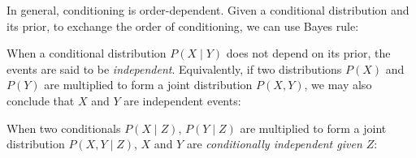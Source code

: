 \documentclass[11pt]{article}
\begin{document}
\begin{prooftree}
\end{prooftree}

\noindent In general, conditioning is order-dependent. Given a conditional distribution and its prior, to exchange the order of conditioning, we can use Bayes rule:

\begin{prooftree}
\end{prooftree}

\noindent When a conditional distribution $P(X \mid Y)$ does not depend on its prior, the events are said to be \textit{independent}. Equivalently, if two distributions $P(X)$ and $P(Y)$ are multiplied to form a joint distribution $P(X, Y)$, we may also conclude that $X$ and $Y$ are independent events:


\noindent When two conditionals $P(X \mid Z)$, $P(Y \mid Z)$ are multiplied to form a joint distribution $P(X, Y \mid Z)$, $X$ and $Y$ are \textit{conditionally independent given $Z$}:

\begin{prooftree}
\end{prooftree}

%
\end{document}

